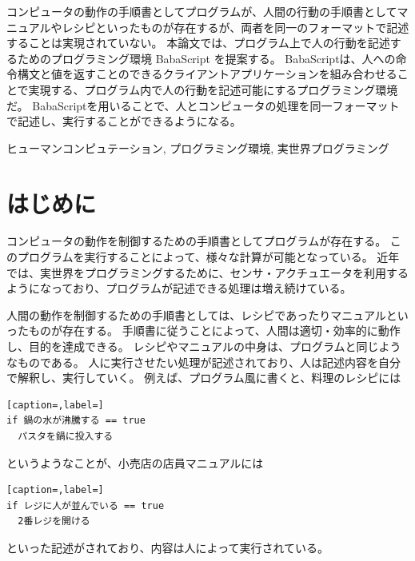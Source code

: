 \documentclass{deimj}
\begin{document}
\pagestyle{empty}
\begin{jabstract}
コンピュータの動作の手順書としてプログラムが、人間の行動の手順書としてマニュアルやレシピといったものが存在するが、両者を同一のフォーマットで記述することは実現されていない。
本論文では、プログラム上で人の行動を記述するためのプログラミング環境 BabaScript を提案する。
BabaScriptは、人への命令構文と値を返すことのできるクライアントアプリケーションを組み合わせることで実現する、プログラム内で人の行動を記述可能にするプログラミング環境だ。
BabaScriptを用いることで、人とコンピュータの処理を同一フォーマットで記述し、実行することができるようになる。
\end{jabstract}
\begin{jkeyword}
ヒューマンコンピュテーション, プログラミング環境, 実世界プログラミング
\end{jkeyword}
\maketitle

\section{はじめに}

コンピュータの動作を制御するための手順書としてプログラムが存在する。
このプログラムを実行することによって、様々な計算が可能となっている。
近年では、実世界をプログラミングするために、センサ・アクチュエータを利用するようになっており、プログラムが記述できる処理は増え続けている。

人間の動作を制御するための手順書としては、レシピであったりマニュアルといったものが存在する。
手順書に従うことによって、人間は適切・効率的に動作し、目的を達成できる。
レシピやマニュアルの中身は、プログラムと同じようなものである。
人に実行させたい処理が記述されており、人は記述内容を自分で解釈し、実行していく。
例えば、プログラム風に書くと、料理のレシピには

\begin{lstlisting}[caption=,label=]
if 鍋の水が沸騰する == true
  パスタを鍋に投入する
\end{lstlisting}
    
というようなことが、小売店の店員マニュアルには

\begin{lstlisting}[caption=,label=]
if レジに人が並んでいる == true
  2番レジを開ける
\end{lstlisting}
    
といった記述がされており、内容は人によって実行されている。
\end{document}

